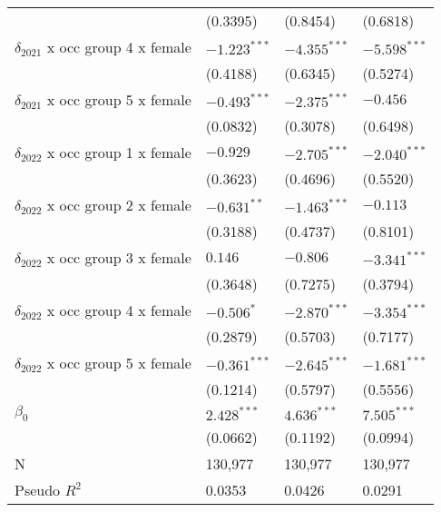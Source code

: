 \begin{tabular}{llll}
                                       &           (0.3395) &           (0.8454) &           (0.6818) \\
$\delta_{2021}$ x occ group 4 x female &     $-1.223^{***}$ &     $-4.355^{***}$ &     $-5.598^{***}$ \\
                                       &           (0.4188) &           (0.6345) &           (0.5274) \\
$\delta_{2021}$ x occ group 5 x female &     $-0.493^{***}$ &     $-2.375^{***}$ &           $-0.456$ \\
                                       &           (0.0832) &           (0.3078) &           (0.6498) \\
$\delta_{2022}$ x occ group 1 x female &           $-0.929$ &     $-2.705^{***}$ &     $-2.040^{***}$ \\
                                       &           (0.3623) &           (0.4696) &           (0.5520) \\
$\delta_{2022}$ x occ group 2 x female &      $-0.631^{**}$ &     $-1.463^{***}$ &           $-0.113$ \\
                                       &           (0.3188) &           (0.4737) &           (0.8101) \\
$\delta_{2022}$ x occ group 3 x female &            $0.146$ &           $-0.806$ &     $-3.341^{***}$ \\
                                       &           (0.3648) &           (0.7275) &           (0.3794) \\
$\delta_{2022}$ x occ group 4 x female &         $-0.506^*$ &     $-2.870^{***}$ &     $-3.354^{***}$ \\
                                       &           (0.2879) &           (0.5703) &           (0.7177) \\
$\delta_{2022}$ x occ group 5 x female &     $-0.361^{***}$ &     $-2.645^{***}$ &     $-1.681^{***}$ \\
                                       &           (0.1214) &           (0.5797) &           (0.5556) \\
$\beta_0$                              &      $2.428^{***}$ &      $4.636^{***}$ &      $7.505^{***}$ \\
                                       &           (0.0662) &           (0.1192) &           (0.0994) \\
N                                      &            130,977 &            130,977 &            130,977 \\
Pseudo $R^2$                           &             0.0353 &             0.0426 &             0.0291 \\
\bottomrule
\end{tabular}
